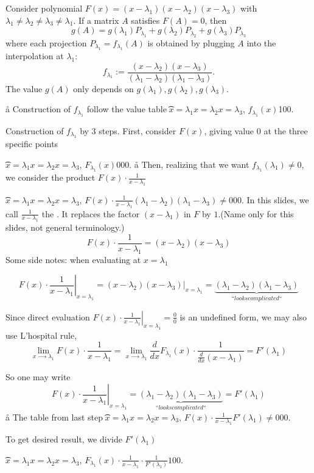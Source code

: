 
\let\oldepsilon\epsilon
\def\epsilon{{\color{blue}\bf\oldepsilon}}
\let\oldinfty\infty
\def\infty{{\color{red}\bf\oldinfty}}


Consider polynomial \( F(x) = (x-\lambda_1)(x-\lambda_2)(x-\lambda_3) \) with $λ_1≠λ_2≠λ_3≠λ_1$.
\vfill
If a matrix $A$ satisfies $F(A)=0$, then 
\vfill
 $$g(A)=g(λ_1)P_{λ_1}+g(λ_2)P_{λ_2}+g(λ_3)P_{λ_3}$$
\vfill
where each projection $P_{λ_1} = f_{λ_1}(A)$ is obtained by plugging $A$ into the
interpolation at \( \lambda_1 \): 
$$ f_{λ_1}:=\frac{(x-\lambda_2)(x-\lambda_3)}{(\lambda_1-\lambda_2)(\lambda_1-\lambda_3)} .$$
\vfill
 The value $g(A)$ only depends on $g(λ_1), g(λ_2), g(λ_3)$.


\a\aa
Construction of $f_{λ_1}$ follow the value table
\t{}{$x=λ_1$}{$x=λ_2$}{$x=λ_3$},
{$f_{λ_1}(x)$}100.

Construction of $f_{λ_1}$ by 3 steps.
\vfill
First, consider $F(x)$, giving value $0$ at the three specific points 

\t{}{$x=λ_1$}{$x=λ_2$}{$x=λ_3$},
{$F_{λ_1}(x)$}000.
\a\aa
Then, realizing that we want $f_{λ_1}(λ_1)≠0$, we consider the product $F(x)·\frac1{x-λ_1}$

\t{}{$x=λ_1$}{$x=λ_2$}{$x=λ_3$},
{$F(x)·\frac1{x-λ_1}$}{$(λ_1-λ_2)(λ_1-λ_3)≠0$}00.
\vfill
In this slides, we call $\frac1{x-λ_1}$ the . It replaces the factor $(x-λ_1)$ in $F$ by $1$.(Name only for this slides, not general terminology.)
$$
F(x)·\frac1{x-λ_1} = (x-λ_2)(x-λ_3)
$$
Some side notes: when evaluating at $x=λ_1$

$$
\left.F(x)·\frac1{x-λ_1}\right|_{x=λ_1} = \left.(x-λ_2)(x-λ_3)\right|_{x=λ_1} = \underbrace{(λ_1-λ_2)(λ_1-λ_3)}_{“looks complicated“}
$$

Since direct evaluation $\left.F(x)·\frac1{x-λ_1}\right|_{x=λ_1} = \frac 00 $ is an undefined form, we may also use L'hospital rule,
$$
\lim_{x ⟶  λ_1} F(x)·\frac1{x-λ_1} = \lim_{x ⟶  λ_1}\frac d{dx}F_{λ_1}(x)·\frac1{\frac d{dx}(x-λ_1)} = F'(λ_1)
$$

So one may write 
$$
\left.F(x)·\frac1{x-λ_1}\right|_{x=λ_1} = \underbrace{(λ_1-λ_2)(λ_1-λ_3)}_{“looks complicated“} = F'(λ_1)
$$
\a\aa
The table from last step
\t{}{$x=λ_1$}{$x=λ_2$}{$x=λ_3$},
{$F(x)·\frac1{x-λ_1}$}{$F'(λ_1)≠0$}00.
\vfill

To get desired result, we divide $F'(λ_1)$

\t{}{$x=λ_1$}{$x=λ_2$}{$x=λ_3$},
{$F_{λ_1}(x)\cdot\frac1{x-λ_1}·\frac1{F'(λ_1)}$}{$1$}00.

